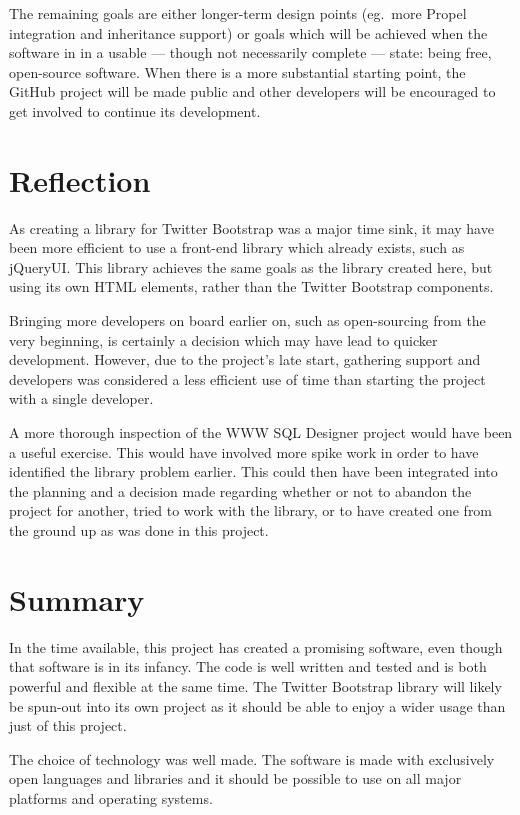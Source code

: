 The remaining goals are either longer-term design points (eg.\ more Propel integration and inheritance support) or goals which will be achieved when the software in in a usable --- though not necessarily complete --- state: being free, open-source software. When there is a more substantial starting point, the GitHub project will be made public and other developers will be encouraged to get involved to continue its development.

\section{Reflection}
As creating a library for Twitter Bootstrap was a major time sink, it may have been more efficient to use a front-end library which already exists, such as jQueryUI. This library achieves the same goals as the library created here, but using its own HTML elements, rather than the Twitter Bootstrap components.

Bringing more developers on board earlier on, such as open-sourcing from the very beginning, is certainly a decision which may have lead to quicker development. However, due to the project's late start, gathering support and developers was considered a less efficient use of time than starting the project with a single developer.

A more thorough inspection of the WWW SQL Designer project would have been a useful exercise. This would have involved more spike work in order to have identified the library problem earlier. This could then have been integrated into the planning and a decision made regarding whether or not to abandon the project for another, tried to work with the library, or to have created one from the ground up as was done in this project.

\section{Summary}
In the time available, this project has created a promising software, even though that software is in its infancy. The code is well written and tested and is both powerful and flexible at the same time. The Twitter Bootstrap library will likely be spun-out into its own project as it should be able to enjoy a wider usage than just of this project.

The choice of technology was well made. The software is made with exclusively open languages and libraries and it should be possible to use on all major platforms and operating systems.

